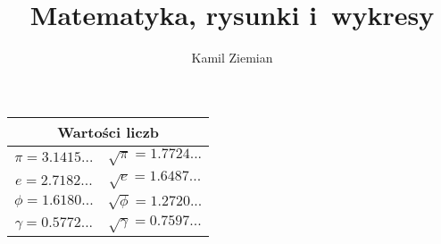 \documentclass[a4paper,11pt]{article}
\title{Matematyka, rysunki i~wykresy}
\author{Kamil Ziemian}
\begin{document}





\maketitle %



\begin{center}

  \begin{tabular}{|c|c|}
    \hline
    \multicolumn{2}{|c|}{Wartości liczb} \\
    \hline
    $\pi = 3.1415...$ & $\sqrt{ \pi } = 1.7724...$ \\
    $e = 2.7182...$ & $\sqrt{ e } = 1.6487...$ \\
    $\phi = 1.6180...$ & $\sqrt{ \phi } = 1.2720...$ \\
    $\gamma = 0.5772...$ & $\sqrt{ \gamma } = 0.7597...$ \\
    \hline
  \end{tabular}

\end{center}
\end{document}

